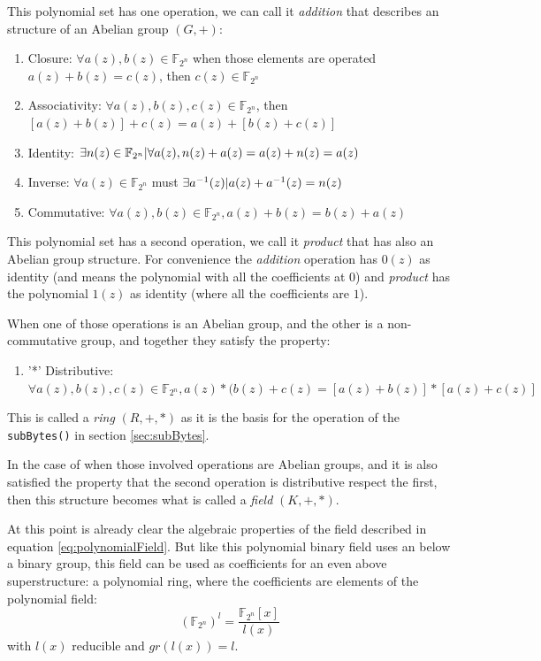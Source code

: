 \documentclass[10pt,a4paper,twoside]{llncs}
\newcommand{\Fpn}[2]{\ensuremath{\mathbb{F}_{#1^#2}}}
\begin{document}
This polynomial set has one operation, we can call it \emph{addition} that describes an structure of an Abelian group $(G,+)$:
\begin{enumerate}
 \item Closure: $\forall a(z),b(z) \in \Fpn{2}{n}$ when those elements are operated $a(z)+b(z)=c(z)$, then $c(z) \in \Fpn{2}{n}$
 \item Associativity: $\forall a(z),b(z),c(z) \in \Fpn{2}{n}$, then $[a(z)+b(z)]+c(z)=a(z)+[b(z)+c(z)]$
 \item Identity: $\exists n(z) \in \Fpn{2}{n} \arrowvert \forall a(z), n(z)+a(z)=a(z)+n(z)=a(z)$
 \item Inverse: $\forall a(z) \in \Fpn{2}{n}$ must $\exists a^{-1}(z) \arrowvert a(z)+a^{-1}(z) = n(z)$
 \item Commutative: $\forall a(z),b(z) \in \Fpn{2}{n}, a(z)+b(z)=b(z)+a(z)$
\end{enumerate}

This polynomial set has a second operation, we call it \emph{product} that has also an Abelian group structure. For convenience the \emph{addition} operation has $0(z)$ as identity (and means the polynomial with all the coefficients at $0$) and \emph{product} has the polynomial $1(z)$ as identity (where all the coefficients are $1$).

When one of those operations is an Abelian group, and the other is a non-commutative group, and together they satisfy the property:
\begin{enumerate}
 \item '*' Distributive: $\forall a(z),b(z),c(z) \in \Fpn{2}{n}, a(z)*(b(z)+c(z)=[a(z)+b(z)]*[a(z)+c(z)]$
\end{enumerate}
This is called a \emph{ring} $(R,+,*)$ as it is the basis for the operation of the {\tt subBytes()} in section \ref{sec:subBytes}.

In the case of when those involved operations are Abelian groups, and it is also satisfied the property that the second operation is distributive respect the first, then this structure becomes what is called a \emph{field} $(K,+,*)$.

At this point is already clear the algebraic properties of the field described in equation \ref{eq:polynomialField}. But like this polynomial binary field uses an below a binary group, this field can be used as coefficients for an even above superstructure: a polynomial ring, where the coefficients are elements of the polynomial field:
\begin{equation}\label{eq:polynomialRing}
    (\Fpn{2}{n})^l=\frac{\Fpn{2}{n}[x]}{l(x)}
\end{equation}
with $l(x)$ reducible and $gr(l(x))=l$.
\end{document}
